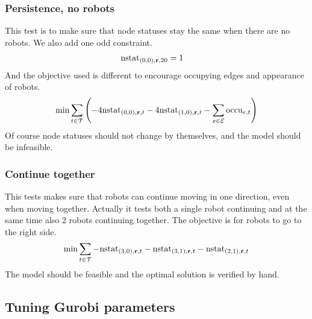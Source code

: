 \subsubsection{Persistence, no robots}
This test is to make sure that node statuses stay the same when there are no
robots.
We also add one odd constraint.
\begin{align}
    \mathrm{nstat}_{(0,0),\text{\bf r},20} &= 1
\end{align}
And the objective used is different to encourage occupying edges and
appearance of robots.
\begin{align}
    \min \sum_{t \in \mathcal{T}}\left( -4\mathrm{nstat}_{(0,0), \text{\bf r}, t}
    -4\mathrm{nstat}_{(1,0),\text{\bf r},t} -\sum_{e \in \mathcal{E}} \mathrm{occu}_{e,t} \right)
\end{align}
Of course node statuses should not change by themselves, and the model should be
infeasible.

\subsubsection{Continue together}
This tests makes sure that robots can continue moving in one direction, even
when moving together. Actually it tests both a single robot continuing and at
the same time also 2 robots continuing together.
The objective is for robots to go to the right side.
\begin{align}
    \min \sum_{t \in \mathcal{T}} -\mathrm{nstat}_{(3,0), \text{\bf r}, t} -\mathrm{nstat}_{(3,1),\text{\bf r},t} -\mathrm{nstat}_{(2,1),\text{\bf r},t}
\end{align}
The model should be feasible and the optimal solution is verified by hand.

\subsection{Tuning Gurobi parameters}
